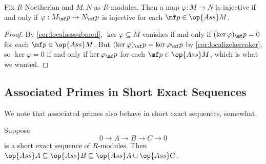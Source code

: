 \begin{corollary}
	Fix $R$ Noetherian and $M,N$ as $R$-modules. Then a map $\varphi:M\to N$ is injective if and only if $\varphi:M_\mf p\to N_\mf p$ is injective for each $\mf p\in\op{Ass}M$.
\end{corollary}
\begin{proof}
	By \autoref{cor:localasssubmod}, $\ker\varphi\subseteq M$ vanishes if and only if $(\ker\varphi)_\mf p=0$ for each $\mf p\in\op{Ass}M$. But $(\ker\varphi)_\mf p=\ker\varphi_\mf p$ by \autoref{cor:localizekercoker}, so $\ker\varphi=0$ if and only if $\ker\varphi_\mf p$ for each $\mf p\in\op{Ass}M$, which is what we wanted.
\end{proof}

\subsection{Associated Primes in Short Exact Sequences}
We note that associated primes also behave in short exact sequences, somewhat.
\begin{lemma} \label{lem:assses}
	Suppose
	\[0\to A\to B\to C\to 0\]
	is a short exact sequence of $R$-modules. Then $\op{Ass}A\subseteq\op{Ass}B\subseteq\op{Ass}A\cup\op{Ass}C$.
\end{lemma}
